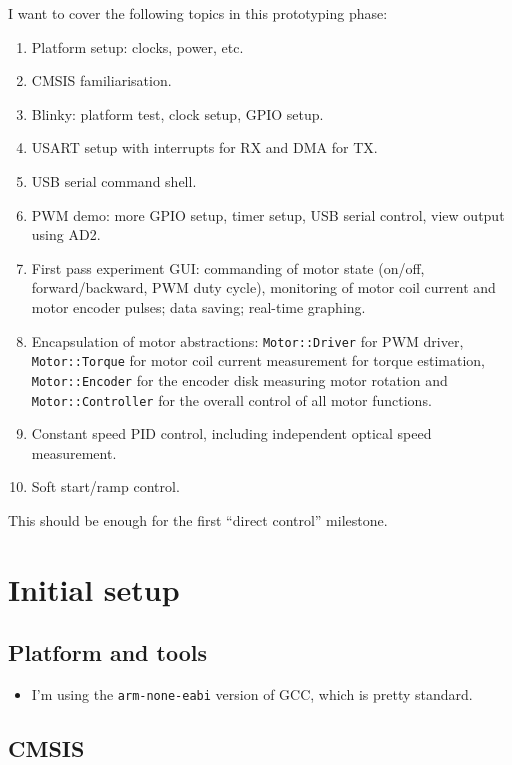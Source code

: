 \documentclass[a4paper,11pt]{article}
\begin{document}
I want to cover the following topics in this prototyping phase:
\begin{enumerate}
  \item{Platform setup: clocks, power, etc.}
  \item{CMSIS familiarisation.}
  \item{Blinky: platform test, clock setup, GPIO setup.}
  \item{USART setup with interrupts for RX and DMA for TX.}
  \item{USB serial command shell.}
  \item{PWM demo: more GPIO setup, timer setup, USB serial control,
    view output using AD2.}
  \item{First pass experiment GUI: commanding of motor state (on/off,
    forward/backward, PWM duty cycle), monitoring of motor coil
    current and motor encoder pulses; data saving; real-time
    graphing.}
  \item{Encapsulation of motor abstractions: \texttt{Motor::Driver}
    for PWM driver, \texttt{Motor::Torque} for motor coil current
    measurement for torque estimation, \texttt{Motor::Encoder} for the
    encoder disk measuring motor rotation and
    \texttt{Motor::Controller} for the overall control of all motor
    functions.}
  \item{Constant speed PID control, including independent optical
    speed measurement.}
  \item{Soft start/ramp control.}
\end{enumerate}

This should be enough for the first ``direct control'' milestone.


\section{Initial setup}

\subsection{Platform and tools}

\begin{itemize}
  \item{I'm using the \texttt{arm-none-eabi} version of GCC, which is
    pretty standard.}
\end{itemize}

\subsection{CMSIS}
\end{document}

